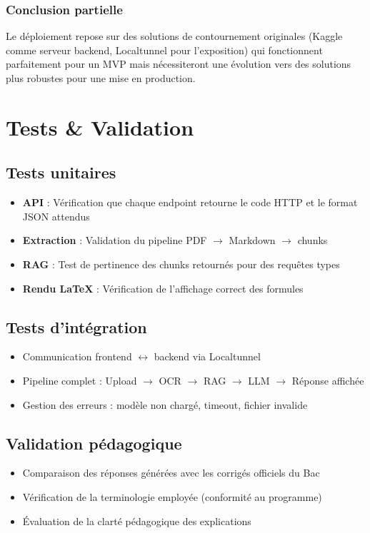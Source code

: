 \documentclass[12pt,a4paper]{report}
\begin{document}
\subsection*{Conclusion partielle}
Le déploiement repose sur des solutions de contournement originales (Kaggle comme serveur backend, Localtunnel pour l'exposition) qui fonctionnent parfaitement pour un MVP mais nécessiteront une évolution vers des solutions plus robustes pour une mise en production.

\chapter{Tests \& Validation}

\section{Tests unitaires}
\begin{itemize}
    \item \textbf{API} : Vérification que chaque endpoint retourne le code HTTP et le format JSON attendus
    \item \textbf{Extraction} : Validation du pipeline PDF $\rightarrow$ Markdown $\rightarrow$ chunks
    \item \textbf{RAG} : Test de pertinence des chunks retournés pour des requêtes types
    \item \textbf{Rendu LaTeX} : Vérification de l'affichage correct des formules
\end{itemize}

\section{Tests d'intégration}
\begin{itemize}
    \item Communication frontend $\leftrightarrow$ backend via Localtunnel
    \item Pipeline complet : Upload $\rightarrow$ OCR $\rightarrow$ RAG $\rightarrow$ LLM $\rightarrow$ Réponse affichée
    \item Gestion des erreurs : modèle non chargé, timeout, fichier invalide
\end{itemize}

\section{Validation pédagogique}
\begin{itemize}
    \item Comparaison des réponses générées avec les corrigés officiels du Bac
    \item Vérification de la terminologie employée (conformité au programme)
    \item Évaluation de la clarté pédagogique des explications
\end{itemize}
\end{document}
